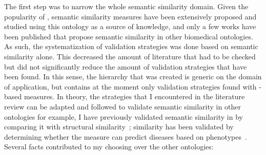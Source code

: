 The first step was to narrow the whole semantic similarity domain. Given the popularity of , semantic similarity measures have been extensively proposed and studied using this ontology as a source of knowledge, and only a few works have been published that propose semantic similarity in other biomedical ontologies. As such, the systematization of validation strategies was done based on  semantic similarity alone. This decreased the amount of literature that had to be checked but did not significantly reduce the amount of validation strategies that have been found. In this sense, the hierarchy that was created is generic on the domain of application, but contains at the moment only validation strategies found with -based measures. In theory, the strategies that I encountered in the literature review can be adapted and followed to validate semantic similarity in other ontologies \mdash for example, I have previously validated semantic similarity in  by comparing it with structural similarity~\citep{Ferreira2010,Ferreira2013};  similarity has been validated by determining whether the measure can predict diseases based on phenotypes~\citep{Kohler2009}. Several facts contributed to my choosing  over the other ontologies:
